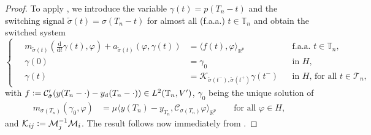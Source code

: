 \documentclass[reqno]{amsart}
\newcommand{\R}{\mathbb R}
\newcommand{\timeInt}{\mathbb{T}}
\newcommand{\adState}{p}
\newcommand{\desired}[1]{#1_{\mathrm{d}}}
\newcommand{\outVar}{y}
\newcommand{\outVarDes}{\desired{y}}
\newcommand{\outVarDim}{p}
\newcommand{\ddt}{\tfrac{\mathrm{d}}{\mathrm{d}t}}
\newcommand{\cOper}{\calC}
\newcommand{\kOper}{\calK}
\newcommand{\switch}{\sigma}
\newcommand{\calC}{\mathcal{C}}
\newcommand{\calK}{\mathcal{K}}
\newcommand{\calM}{\mathcal{M}}
\newcommand{\calT}{\mathcal{T}}
\begin{document}
\begin{proof}   
    To apply , we introduce the variable $\gamma(t) = \adState(T_n-t)$ and the switching signal $\tilde{\switch}(t) = \switch(T_n-t)$ for almost all (f.a.a.) $t\in\timeInt_n$ and obtain the switched system
    \begin{equation}\nonumber
        \left\{\quad\begin{aligned}
            m_{\tilde{\switch}(t)}(\ddt \gamma(t),\varphi) + a_{\tilde{\switch}(t)}(\varphi,\gamma(t)) &= \langle f(t),\varphi\rangle_{\R^{\outVarDim}}&& \text{f.a.a. } t\in \timeInt_n,\\
            \gamma(0) &= \gamma_0 && \text{in $H$},\\ 
            \gamma(t) &= \calK_{\tilde{\switch}(t^-),\tilde{\switch}(t^+)}\gamma(t^-) && \text{in $H$, for all $t\in\calT_n$}, 
        \end{aligned}\right.
    \end{equation}
    with $f\vcentcolon=\cOper_{\tilde{\switch}}'(\outVar(T_n-\cdot) - \outVarDes(T_n-\cdot))\in L^2(\timeInt_n,V')$, $\gamma_0$ being the unique solution of
    \begin{align*}
        m_{\switch(T_n)}(\gamma_0,\varphi) &= \mu\langle \outVar(T_n)- \outVar_{T_n},\cOper_{\switch(T_n)} \varphi\rangle_{\R^{\outVarDim}}\qquad\text{for all $\varphi\in H$},
    \end{align*}
    and $\kOper_{ij} \vcentcolon= \calM_j^{-1}\calM_i$. The result follows now immediately from .
\end{proof}
\end{document}
